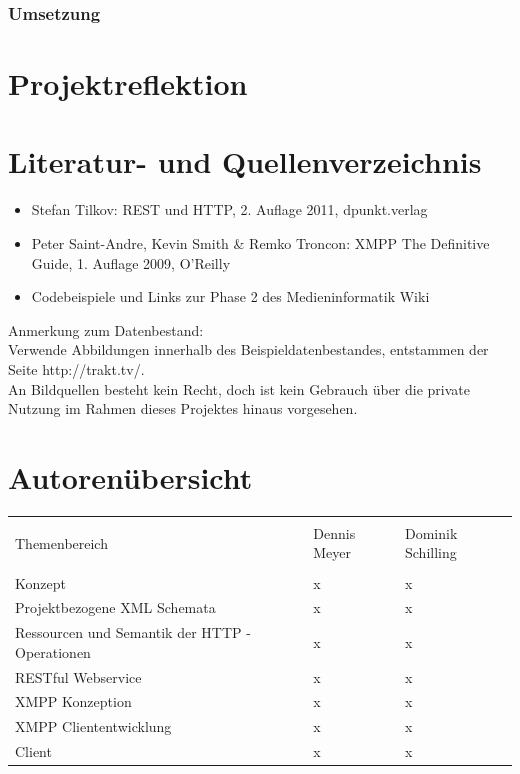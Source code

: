 \documentclass[a4paper]{article}
\begin{document}
\newpage
\subsubsection{Umsetzung}



\newpage

\section{Projektreflektion}
\newpage


\section{Literatur- und Quellenverzeichnis}
\begin{itemize}
\item
Stefan Tilkov: REST und HTTP, 2. Auflage 2011, dpunkt.verlag
\item
Peter Saint-Andre, Kevin Smith \& Remko Troncon: XMPP The Definitive Guide, 1. Auflage 2009, O'Reilly
\item
Codebeispiele und Links zur Phase 2 des Medieninformatik Wiki
\end{itemize}

Anmerkung zum Datenbestand:\\ 
Verwende Abbildungen innerhalb des Beispieldatenbestandes, entstammen der Seite http://trakt.tv/.\\
An Bildquellen besteht kein Recht, doch ist kein Gebrauch über die private Nutzung im Rahmen dieses Projektes hinaus vorgesehen.

\newpage

\section{Autorenübersicht}

\begin{table}[H]

\centering
\begin{tabular}{l l l}
\\ [-0.5ex]
\hline\hline
\\ [-0.5ex]
Themenbereich & Dennis Meyer & Dominik Schilling
\\ [1.5ex]
\hline
\\ [-0.5ex]
Konzept & x & x  \\[1ex]
Projektbezogene XML Schemata & x & x \\[1ex]
Ressourcen und Semantik der HTTP - Operationen & x & x \\[1ex]
RESTful Webservice & x & x \\[1ex]
XMPP Konzeption & x & x\\[1ex]
XMPP Cliententwicklung & x & x\\[1ex]
Client & x & x \\[1ex]
\hline
\end{tabular}
\label{tab:ressourcendesserientrackers}
\end{table}
\end{document}
